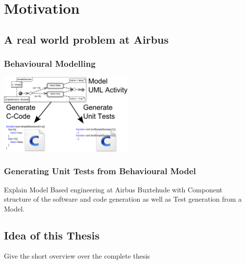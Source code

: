 \chapter{Motivation}
\section{A real world problem at Airbus}
\subsection{Behavioural Modelling}
\includegraphics[width=0.5\textwidth]{./pics/Activity2Code+Tests.png}
\subsection{Generating Unit Tests from Behavioural Model}
Explain Model Based engineering at Airbus Buxtehude with Component structure of the software and code generation as well as Test generation from a Model.
\section{Idea of this Thesis}

Give the short overview over the complete thesis